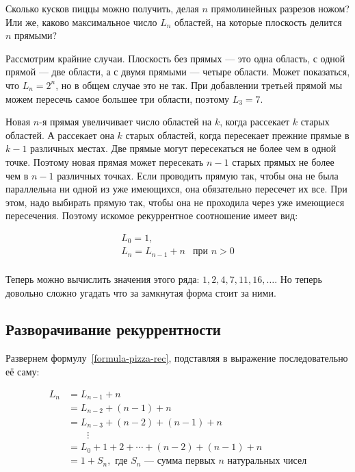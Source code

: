 \documentclass[14pt]{book}
\begin{document}
Сколько кусков пиццы можно получить, делая $n$ прямолинейных разрезов ножом?
Или же, каково максимальное число $L_n$ областей, на которые плоскость делится
$n$ прямыми?

Рассмотрим крайние случаи. Плоскость без прямых --- это одна область, 
с одной прямой --- две области, а с двумя прямыми --- четыре области.
Может показаться, что $L_n = 2^n$, но в общем случае это не так.
При добавлении третьей прямой мы можем пересечь самое большее три области,
поэтому $L_3 = 7$.

Новая $n$-я прямая увеличивает число областей на $k$, когда рассекает $k$ старых
областей. А рассекает она $k$ старых областей, когда пересекает прежние прямые
в $k-1$ различных местах. Две прямые могут пересекаться не более чем в одной точке.
Поэтому новая прямая может пересекать $n-1$ старых прямых не более чем в $n-1$
различных точках. Если проводить прямую так, чтобы она не была параллельна ни одной
из уже имеющихся, она обязательно пересечет их все. При этом, надо выбирать прямую так,
чтобы она не проходила через уже имеющиеся пересечения. Поэтому искомое рекуррентное
соотношение имеет вид:

\begin{equation}
\label{formula-pizza-rec}
\begin{array}{ll}
L_0 = 1, \\
L_n = L_{n-1} + n & \text{при } n > 0 \\
\end{array}
\end{equation}

Теперь можно вычислить значения этого ряда: $1, 2, 4, 7, 11, 16, \ldots$. 
Но теперь довольно сложно угадать что за замкнутая форма стоит за ними.

\subsection{Разворачивание рекуррентности}

Развернем формулу~\ref{formula-pizza-rec}, подставляя в выражение последовательно её саму:

\begin{align*}
L_n &= L_{n-1} + n \\
    &= L_{n-2} + (n-1) + n \\
    &= L_{n-3} + (n-2) + (n-1) + n \\
    & \qquad\vdots \\
    &= L_0 + 1 + 2 + \cdots + (n-2) + (n-1) + n \\
    &= 1 + S_n, \text{ где $S_n$ --- сумма первых $n$ натуральных чисел}
\end{align*}
\end{document}
